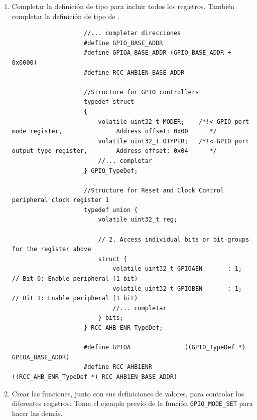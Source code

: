 \documentclass[../main.tex]{subfiles}
\begin{document}
        \begin{enumerate}
            \item Completar la definición de tipo para incluir todos los registros. También completar la definición de tipo de .
            
                \begin{lstlisting}
                    //... completar direcciones
                    #define GPIO_BASE_ADDR 
                    #define GPIOA_BASE_ADDR (GPIO_BASE_ADDR + 0x0000)
                    #define RCC_AHB1EN_BASE_ADDR 

                    //Structure for GPIO controllers
                    typedef struct
                    {
                        volatile uint32_t MODER;    /*!< GPIO port mode register,               Address offset: 0x00      */
                        volatile uint32_t OTYPER;   /*!< GPIO port output type register,        Address offset: 0x04      */
                        //... completar
                    } GPIO_TypeDef;

                    //Structure for Reset and Clock Control peripheral clock register 1
                    typedef union {
                        volatile uint32_t reg;

                        // 2. Access individual bits or bit-groups for the register above
                        struct {
                            volatile uint32_t GPIOAEN   	: 1;  // Bit 0: Enable peripheral (1 bit)
                            volatile uint32_t GPIOBEN   	: 1;  // Bit 1: Enable peripheral (1 bit)
                            //... completar
                        } bits;
                    } RCC_AHB_ENR_TypeDef;

                    #define GPIOA               ((GPIO_TypeDef *) GPIOA_BASE_ADDR)
                    #define RCC_AHB1ENR 		((RCC_AHB_ENR_TypeDef *) RCC_AHB1EN_BASE_ADDR)
                \end{lstlisting}
            \item Crear las funciones, junto con sus definiciones de valores, para controlar los diferentes registros. Toma el ejemplo previo de la función \lstinline|GPIO_MODE_SET| para hacer las demás.
            

\end{enumerate}
\end{document}
